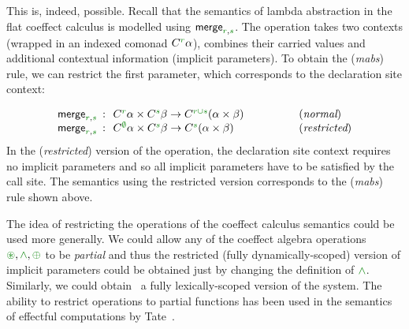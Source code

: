 This is, indeed, possible. Recall that the semantics of lambda abstraction in the flat
coeffect calculus is modelled using $\ident{merge}_{\cclrd{r}, \cclrd{s}}$. The operation takes
two contexts (wrapped in an indexed comonad $\ctyp{\cclrd{r}}\alpha$), combines their carried
values and additional contextual information (implicit parameters). To obtain the (\emph{mabs})
rule, we can restrict the first parameter, which corresponds to the declaration site context:

\begin{equation*}
\begin{array}{rcll}
 \ident{merge}_{\cclrd{r}, \cclrd{s}} &\narrow{:}& \ctyp{\cclrd{r}}\alpha \times \ctyp{\cclrd{s}}\beta \rightarrow \ctyp{\cclrd{r \cup s}}(\alpha \times \beta)
 &\hspace{4em}(\textit{normal}) \\
 \ident{merge}_{\cclrd{r}, \cclrd{s}} &\narrow{:}& \ctyp{\cclrd{\emptyset}}\alpha \times \ctyp{\cclrd{s}}\beta \rightarrow \ctyp{\cclrd{s}}(\alpha \times \beta)
 &\hspace{4em}(\textit{restricted})
\end{array}
\end{equation*}
%
In the (\emph{restricted}) version of the operation, the declaration site context requires
no implicit parameters and so all implicit parameters have to be satisfied by the call site.
The semantics using the restricted version corresponds to the (\emph{mabs}) rule shown above.

The idea of restricting the operations of the coeffect calculus semantics could be used more
generally. We could allow any of the coeffect algebra operations $\cseq, \czip, \cpar$ to be
\emph{partial} and thus the restricted (fully dynamically-scoped) version of implicit parameters
could be obtained just by changing the definition of $\czip$. Similarly, we could obtain \eg~a
fully lexically-scoped version of the system. The ability to restrict operations to partial
functions has been used in the semantics of effectful computations by Tate~\cite{effects-producer-semantics}.



%
%

